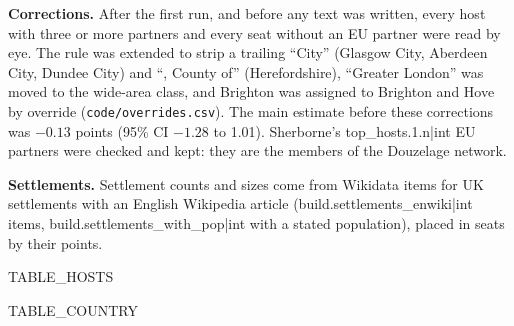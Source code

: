 \documentclass[11pt,a4paper]{article}
\begin{document}
\textbf{Corrections.} After the first run, and before any text was written, every host with three or more partners and every seat without an EU partner were read by eye. The rule was extended to strip a trailing ``City'' (Glasgow City, Aberdeen City, Dundee City) and ``, County of'' (Herefordshire), ``Greater London'' was moved to the wide-area class, and Brighton was assigned to Brighton and Hove by override (\texttt{code/overrides.csv}). The main estimate before these corrections was $-0.13$ points (95\% CI $-1.28$ to 1.01). Sherborne's {{top_hosts.1.n|int}} EU partners were checked and kept: they are the members of the Douzelage network.

\textbf{Settlements.} Settlement counts and sizes come from Wikidata items for UK settlements with an English Wikipedia article ({{build.settlements_enwiki|int}} items, {{build.settlements_with_pop|int}} with a stated population), placed in seats by their points.

{{TABLE_HOSTS}}

{{TABLE_COUNTRY}}
\end{document}
